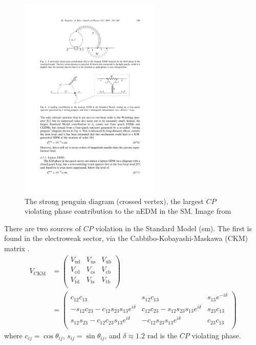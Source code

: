\begin{figure}[htp]
    \centering
    \includegraphics[width=0.6\textwidth]{figures/Pospelov_strong_penguin.pdf}
    \caption[The strong penguin diagram, the largest $CP$ violating phase contribution to the nEDM in the SM]
    {The strong penguin diagram (crossed vertex), the largest $CP$ violating phase contribution to the nEDM in the SM. Image from \cite{POS05}}
    \label{fig:strong_penguin}
\end{figure}

There are two sources of $CP$ violation in the Standard Model (\acrshort*{sm}). The first is found in the electroweak sector, via the Cabbibo-Kobayashi-Maskawa (CKM) matrix \cite{ckm1973, ChauKeung1984, pdg2022}.
%
\begin{align}
    V_\text{CKM} &= \left( \begin{matrix}
    V_\text{ud} & V_\text{us} & V_\text{ub} \\
    V_\text{cd} & V_\text{cs} & V_\text{cb} \\
    V_\text{td} & V_\text{ts} & V_\text{tb} \\
    \end{matrix} \right) \label{eq:CKM} \\
    &= \left( \begin{matrix}
    c_{12}c_{13} & s_{12}c_{13} & s_{13}e^{-i\delta} \\
    -s_{12}c_{23}-c_{12}s_{23}s_{13}e^{i\delta} & c_{12}c_{23}-s_{12}s_{23}s_{13}e^{i\delta} & s_{23}c_{13} \\
    s_{12}s_{23}-c_{12}c_{23}s_{13}e^{i\delta} & -c_{12}s_{23}s_{13}e^{i\delta} & c_{23}c_{13} \\
    \end{matrix} \right)
\end{align}
%
where $c_{ij}=\cos\theta_{ij}$, $s_{ij}=\sin\theta_{ij}$, and $\delta\approx1.2\text{ rad}$ is the $CP$ violating phase.

